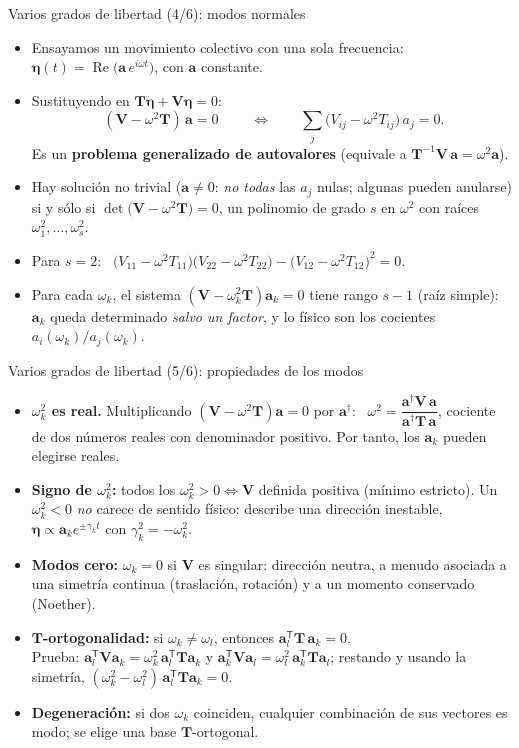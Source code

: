 \documentclass[spanish]{beamer}
\newcommand{\Tm}{\mathbf{T}}              %
\newcommand{\Vm}{\mathbf{V}}              %
\newcommand{\bfeta}{\boldsymbol{\eta}}    %
\newcommand{\ba}{\boldsymbol{a}}          %
\begin{document}
\begin{frame}{Varios grados de libertad (4/6): modos normales}
\small
\begin{itemize}
\item<1-> Ensayamos un movimiento colectivo con una sola frecuencia: $\bfeta(t)=\operatorname{Re}\big(\ba\,e^{i\omega t}\big)$, con $\ba$ constante.
\item<2-> Sustituyendo en $\Tm\ddot{\bfeta}+\Vm\bfeta=0$:
\[
\boxed{\;(\Vm-\omega^2\Tm)\,\ba=0\;}\qquad\Longleftrightarrow\qquad \sum_j\big(V_{ij}-\omega^2T_{ij}\big)\,a_j=0 .
\]
Es un \textbf{problema generalizado de autovalores} (equivale a $\Tm^{-1}\Vm\,\ba=\omega^2\ba$).
\item<3-> Hay solución no trivial ($\ba\neq0$: \emph{no todas} las $a_j$ nulas; algunas pueden anularse) si y sólo si $\det\big(\Vm-\omega^2\Tm\big)=0$, un polinomio de grado $s$ en $\omega^2$ con raíces $\omega_1^2,\ldots,\omega_s^2$.
\item<4-> Para $s=2$: \
$\big(V_{11}-\omega^2T_{11}\big)\big(V_{22}-\omega^2T_{22}\big)-\big(V_{12}-\omega^2T_{12}\big)^2=0 .$
\item<5-> Para cada $\omega_k$, el sistema $(\Vm-\omega_k^2\Tm)\ba_k=0$ tiene rango $s-1$ (raíz simple): $\ba_k$ queda determinado \emph{salvo un factor}, y lo físico son los cocientes $a_i(\omega_k)/a_j(\omega_k)$.
\end{itemize}
\end{frame}

\begin{frame}{Varios grados de libertad (5/6): propiedades de los modos}
\begin{itemize}
\item<1-> \textbf{$\omega_k^2$ es real.} Multiplicando $(\Vm-\omega^2\Tm)\ba=0$ por $\ba^\dagger$: \ $\omega^2=\dfrac{\ba^\dagger\Vm\,\ba}{\ba^\dagger\Tm\,\ba}$, cociente de dos números reales con denominador positivo. Por tanto, los $\ba_k$ pueden elegirse reales.
\item<2-> \textbf{Signo de $\omega_k^2$:} todos los $\omega_k^2>0\iff\Vm$ definida positiva (mínimo estricto). Un $\omega_k^2<0$ \emph{no} carece de sentido físico: describe una dirección inestable, $\bfeta\propto\ba_k e^{\pm\gamma_k t}$ con $\gamma_k^2=-\omega_k^2$.
\item<3-> \textbf{Modos cero:} $\omega_k=0$ si $\Vm$ es singular: dirección neutra, a menudo asociada a una simetría continua (traslación, rotación) y a un momento conservado (Noether).
\item<4-> \textbf{$\Tm$-ortogonalidad:} si $\omega_k\neq\omega_l$, entonces $\ba_l^{\mathsf T}\Tm\,\ba_k=0$. \\
{\small Prueba: $\ba_l^{\mathsf T}\Vm\ba_k=\omega_k^2\,\ba_l^{\mathsf T}\Tm\ba_k$ y $\ba_k^{\mathsf T}\Vm\ba_l=\omega_l^2\,\ba_k^{\mathsf T}\Tm\ba_l$; restando y usando la simetría, $(\omega_k^2-\omega_l^2)\,\ba_l^{\mathsf T}\Tm\ba_k=0$.}
\item<5-> \textbf{Degeneración:} si dos $\omega_k$ coinciden, cualquier combinación de sus vectores es modo; se elige una base $\Tm$-ortogonal.
\end{itemize}
\end{frame}
\end{document}
